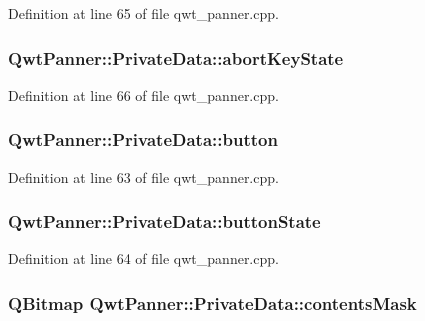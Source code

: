 Definition at line 65 of file qwt\-\_\-panner.\-cpp.

\hypertarget{class_qwt_panner_1_1_private_data_ad967c965e66ffce21d5539e6877ea3e8}{
\subsubsection[{abort\-Key\-State}]{ Qwt\-Panner\-::\-Private\-Data\-::abort\-Key\-State}}\label{class_qwt_panner_1_1_private_data_ad967c965e66ffce21d5539e6877ea3e8}


Definition at line 66 of file qwt\-\_\-panner.\-cpp.

\hypertarget{class_qwt_panner_1_1_private_data_a06c4ad392ffa91ef232d713263abad21}{
\subsubsection[{button}]{ Qwt\-Panner\-::\-Private\-Data\-::button}}\label{class_qwt_panner_1_1_private_data_a06c4ad392ffa91ef232d713263abad21}


Definition at line 63 of file qwt\-\_\-panner.\-cpp.

\hypertarget{class_qwt_panner_1_1_private_data_aa8d4438f9f88ac36c340a80fc7e4ec92}{
\subsubsection[{button\-State}]{ Qwt\-Panner\-::\-Private\-Data\-::button\-State}}\label{class_qwt_panner_1_1_private_data_aa8d4438f9f88ac36c340a80fc7e4ec92}


Definition at line 64 of file qwt\-\_\-panner.\-cpp.

\hypertarget{class_qwt_panner_1_1_private_data_ada6e4d3f592a774fb2d57c8f65e731cb}{
\subsubsection[{contents\-Mask}]{\setlength{\rightskip}{0pt plus 5cm}Q\-Bitmap Qwt\-Panner\-::\-Private\-Data\-::contents\-Mask}}\label{class_qwt_panner_1_1_private_data_ada6e4d3f592a774fb2d57c8f65e731cb}


